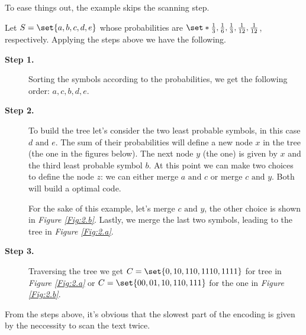 \documentclass{subfiles}
\begin{document}
        \begin{example*}
            To ease things out, the example skips the scanning step.

            Let \(S = \set{a, b, c, d, e}\) whose probabilities are
            \(\set*{\tfrac{1}{3}, \tfrac{1}{6}, \tfrac{1}{3},
            \tfrac{1}{12}, \tfrac{1}{12}}\), respectively. 
            Applying the steps above we have the following.
            \begin{description}
                \item [\textbf{Step 1.}] 
                    Sorting the symbols according to the probabilities,
                    we get the following order: \(a, c, b, d, e\).

                \item [\textbf{Step 2.}] 
                    To build the tree let's consider the 
                    two least probable symbols, in this case \(d \text{ and } e\).
                    The sum of their probabilities will define a new node \(x\) in the
                    tree (the  one in the figures below).
                    The next node \(y\) (the  one) is given by \(x\) 
                    and the third least probable symbol \(b\).
                    At this point we can make two choices to define the node \(z\):
                    we can either merge \(a \text{ and } c\) or merge \(c \text{ and } y\).
                    Both will build a optimal code. 
                    
                    For the sake of this example, let's merge \(c \text{ and } y\),
                    the other choice is shown in \emph{Figure \ref{Fig:2.b}}.
                    Lastly, we merge the last two symbols, 
                    leading to the tree in \emph{Figure \ref{Fig:2.a}}.
                    

                \item [\textbf{Step 3.}] Traversing the tree we get 
                    \(C = \set{0, 10, 110, 1110, 1111}\) for tree in 
                    \emph{Figure \ref{Fig:2.a}} or \(C = \set{00, 01, 10, 110, 111}\)
                    for the one in \emph{Figure \ref{Fig:2.b}}.
            \end{description}   
        \end{example*}

        From the steps above, it's obvious that the slowest part of the encoding
        is given by the neccessity to scan the text twice. 
\end{document}
